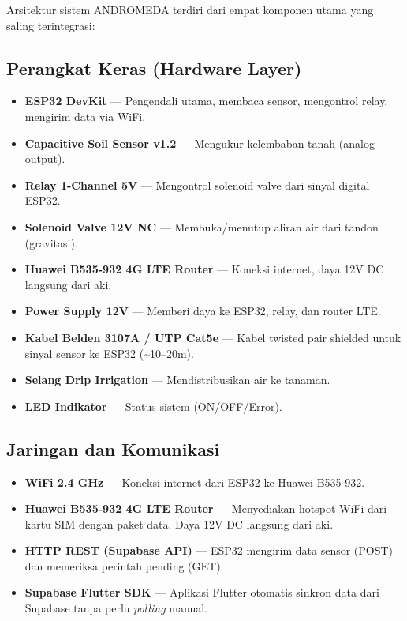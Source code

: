 \documentclass[12pt,a4paper,oneside]{report}
\begin{document}
Arsitektur sistem ANDROMEDA terdiri dari empat komponen utama yang saling terintegrasi:

\subsection{Perangkat Keras (Hardware Layer)}

\begin{itemize}
    \item \textbf{ESP32 DevKit} — Pengendali utama, membaca sensor, mengontrol relay, mengirim data via WiFi.
    \item \textbf{Capacitive Soil Sensor v1.2} — Mengukur kelembaban tanah (analog output).
    \item \textbf{Relay 1-Channel 5V} — Mengontrol solenoid valve dari sinyal digital ESP32.
    \item \textbf{Solenoid Valve 12V NC} — Membuka/menutup aliran air dari tandon (gravitasi).
    \item \textbf{Huawei B535-932 4G LTE Router} — Koneksi internet, daya 12V DC langsung dari aki.
    \item \textbf{Power Supply 12V} — Memberi daya ke ESP32, relay, dan router LTE.
    \item \textbf{Kabel Belden 3107A / UTP Cat5e} — Kabel twisted pair shielded untuk sinyal sensor ke ESP32 (\textasciitilde10--20m).
    \item \textbf{Selang Drip Irrigation} — Mendistribusikan air ke tanaman.
    \item \textbf{LED Indikator} — Status sistem (ON/OFF/Error).
\end{itemize}

\subsection{Jaringan dan Komunikasi}

\begin{itemize}
    \item \textbf{WiFi 2.4 GHz} — Koneksi internet dari ESP32 ke Huawei B535-932.
    \item \textbf{Huawei B535-932 4G LTE Router} — Menyediakan hotspot WiFi dari kartu SIM dengan paket data. Daya 12V DC langsung dari aki.
    \item \textbf{HTTP REST (Supabase API)} — ESP32 mengirim data sensor (POST) dan memeriksa perintah pending (GET).
    \item \textbf{Supabase Flutter SDK} — Aplikasi Flutter otomatis sinkron data dari Supabase tanpa perlu \textit{polling} manual.
\end{itemize}
\end{document}

